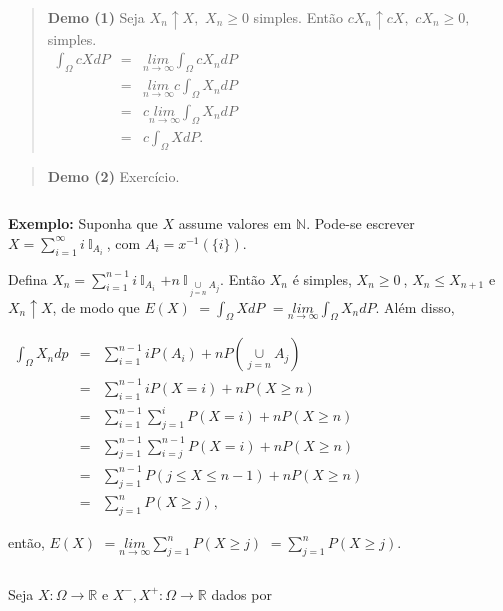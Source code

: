 \documentclass[
]{book}
\begin{document}
\begin{quote}
\textbf{Demo (1)} Seja \(X_n\uparrow X,\) \(X_n \geq 0\) simples. Então \(cX_n\uparrow cX,\) \(cX_n \geq 0,\) simples.\\
\(\begin{array}{rcl} \int_\Omega cX dP & = & \underset{n\rightarrow\infty}{lim}\int_\Omega cX_n dP\\ & = & \underset{n\rightarrow\infty}{lim}c\int_\Omega X_n dP\\ & = & c\underset{n\rightarrow\infty}{lim}\int_\Omega X_n dP\\ & = & c\int_\Omega X dP. \end{array}\)
\end{quote}

\begin{quote}
\textbf{Demo (2)} Exercício.
\end{quote}

\(~\)

\textbf{Exemplo:} Suponha que \(X\) assume valores em \(\mathbb{N}\). Pode-se escrever \(X = \sum_{i=1}^\infty i ~\mathbb{I}_{A_i}~\), com \(A_i = x^{-1}(\{i\})\).

Defina \(X_n = \sum_{i=1}^{n-1} i ~\mathbb{I}_{A_i}\) \(+n~\mathbb{I}_{\underset{j=n}{\cup} A_j}\). Então \(X_n\) é simples, \(X_n \geq 0~\), \(X_n \leq X_{n+1}\) e \(X_n \uparrow X\), de modo que \(E(X)\) \(= \int_\Omega X dP\) \(= \underset{n \rightarrow\infty}{lim}\int_\Omega X_n dP\). Além disso,

\(\begin{array}{rcl} \int_\Omega X_n dp & = & \sum_{i=1}^{n-1} i P(A_i) + nP\left(\underset{j=n}{\cup}A_j\right)\\ & = & \sum_{i=1}^{n-1}iP(X = i) + nP(X \geq n)\\ & = & \sum_{i=1}^{n-1} \sum_{j=1}^{i} P(X = i) + nP(X \geq n)\\ & = & \sum_{j=1}^{n-1} \sum_{i=j}^{n-1} P(X = i) + n P(X \geq n)\\ & = & \sum_{j=1}^{n-1}P(j \leq X \leq n-1) + n P(X \geq n)\\ & = & \sum_{j=1}^n P(X \geq j), \end{array}\)

então, \(E(X)\) \(= \underset{n\rightarrow \infty}{lim} \sum_{j=1}^nP(X \geq j)\) \(= \sum_{j=1}^nP(X \geq j)\).

\(~\)

Seja \(X: \Omega \longrightarrow \mathbb{R}\) e \(X^-,X^+: \Omega \longrightarrow \mathbb{R}\) dados por
\end{document}
